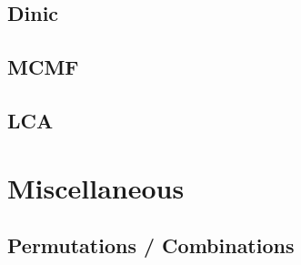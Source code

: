 \documentclass[10pt,landscape,a4paper,twocolumn]{article}
\begin{document}
\subsection{Dinic}


\subsection{MCMF}


\subsection{LCA}


\section{Miscellaneous}
\subsection{Permutations / Combinations}

\end{document}
